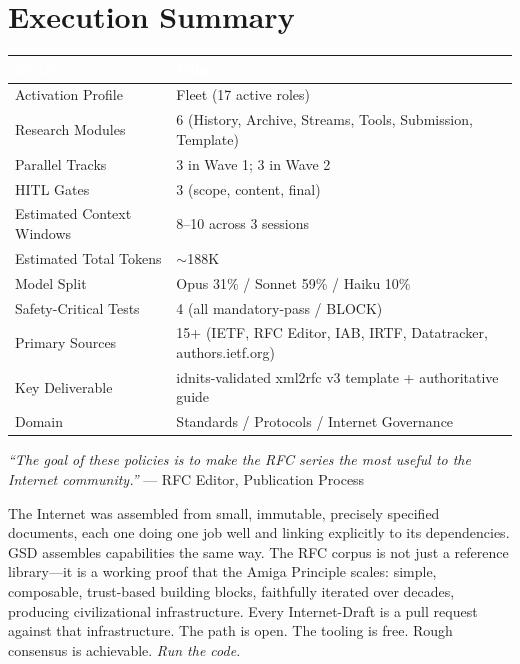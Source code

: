 \documentclass[11pt,letterpaper]{article}
\newcommand{\tableheader}[1]{\textbf{\sffamily\textcolor{white}{#1}}}
\begin{document}
\section{Execution Summary}

\begin{center}
\begin{tabularx}{\textwidth}{L{5cm}X}
\toprule
{}
\tableheader{Metric} & \tableheader{Value} \\
\midrule
Activation Profile & Fleet (17 active roles) \\
Research Modules & 6 (History, Archive, Streams, Tools, Submission, Template) \\
Parallel Tracks & 3 in Wave 1; 3 in Wave 2 \\
HITL Gates & 3 (scope, content, final) \\
Estimated Context Windows & 8--10 across 3 sessions \\
Estimated Total Tokens & $\sim$188K \\
Model Split & Opus 31\% / Sonnet 59\% / Haiku 10\% \\
Safety-Critical Tests & 4 (all mandatory-pass / BLOCK) \\
Primary Sources & 15+ (IETF, RFC Editor, IAB, IRTF, Datatracker, authors.ietf.org) \\
Key Deliverable & idnits-validated xml2rfc v3 template + authoritative guide \\
Domain & Standards / Protocols / Internet Governance \\
\bottomrule
\end{tabularx}
\end{center}

\vspace{2em}

\begin{quotebox}
\textit{``The goal of these policies is to make the RFC series the most useful to the Internet community.''} --- RFC Editor, Publication Process

\vspace{0.8em}
\noindent The Internet was assembled from small, immutable, precisely specified documents, each one doing one job well and linking explicitly to its dependencies. GSD assembles capabilities the same way. The RFC corpus is not just a reference library---it is a working proof that the Amiga Principle scales: simple, composable, trust-based building blocks, faithfully iterated over decades, producing civilizational infrastructure. Every Internet-Draft is a pull request against that infrastructure. The path is open. The tooling is free. Rough consensus is achievable. \textit{Run the code.}
\end{quotebox}
\end{document}
